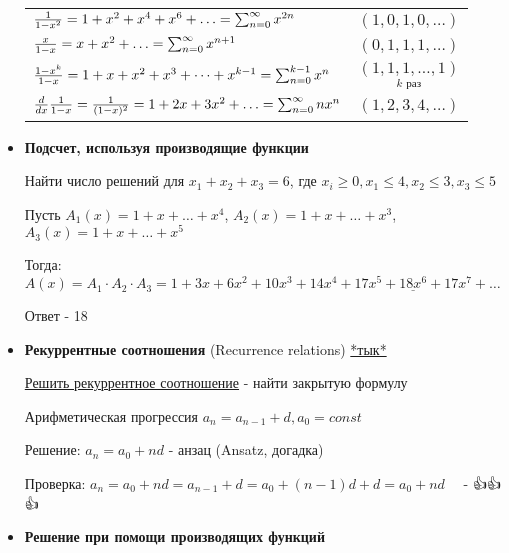 \documentclass[12pt]{article}
\begin{document}
\begin{itemize}
{\begin{tabular}{|p{}|p{}|}
            $\frac{1}{1 - x^2} = 1 + x^2 + x^4 + x^6 + \dots \hfill = \sum_{n = 0}^\infty x^{2n}$ & $(1, 0, 1, 0, \dots)$ \\

            $\frac{x}{1 - x} = x + x^2 + \dots \hfill = \sum_{n = 0}^\infty x^{n + 1}$ & $(0, 1, 1, 1, \dots)$ \\

            $\frac{1 - x^k}{1 - x} = 1 + x + x^2 + x^3 + \dots + x^{k - 1} \hfill = \sum_{n = 0}^{k - 1} x^n$ & $\underset{k \text{ раз}}{(1, 1, 1, \dots, 1)}$ \\

            $\frac{d}{dx}\frac{1}{1 - x} = \frac{1}{(1 - x)^2} = 1 + 2x + 3x^2 + \dots \hfill = \sum_{n = 0}^{\infty} n x^n$ & $(1, 2, 3, 4, \dots)$ \\\hline

        \end{tabular}
        }

        \vspace{2mm}

        \item \textbf{Подсчет, используя производящие функции}

        Найти число решений для $x_1 + x_2 + x_3 = 6$, где $x_i \geq 0, x_1 \leq 4, x_2 \leq 3, x_3 \leq 5$

        Пусть $A_1(x) = 1 + x + \dots + x^4$, $A_2(x) = 1 + x + \dots + x^3$, $A_3(x) = 1 + x + \dots + x^5$

        Тогда: $A(x) = A_1 \cdot A_2 \cdot A_3 = 1 + 3x + 6x^2 + 10x^3 + 14x^4 + 17x^5 + \underline{18x^6} + 17x^7 + \dots$

        Ответ - 18

        \item \textbf{Рекуррентные соотношения} (Recurrence relations)
        \hfill\href{https://ru.wikipedia.org/wiki/%D0%A0%D0%B5%D0%BA%D1%83%D1%80%D1%80%D0%B5%D0%BD%D1%82%D0%BD%D0%B0%D1%8F_%D1%84%D0%BE%D1%80%D0%BC%D1%83%D0%BB%D0%B0}{*тык*}


        \underline{Решить рекуррентное соотношение} - найти закрытую формулу

        \Exs Арифметическая прогрессия $a_n = a_{n - 1} + d, a_0 = const$

        Решение: $a_n = a_0 + nd$ - анзац (Ansatz, догадка)

        Проверка: $a_n = a_0 + nd = a_{n - 1} + d = a_0 + (n - 1)d + d = a_0 + nd \quad$ - {\Large👍👍👍}

        \item \textbf{Решение при помощи производящих функций}


\end{itemize}
\end{document}
